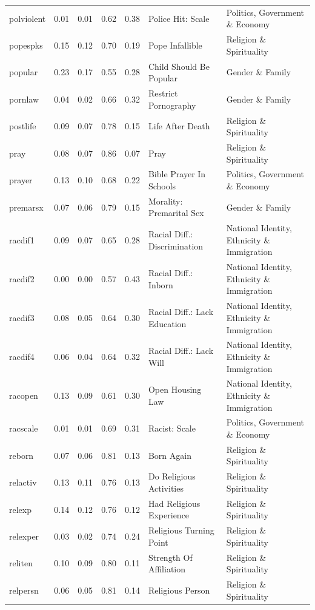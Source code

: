 \documentclass[
  12pt,
]{article}
\begin{document}
\begin{landscape}
\begin{scriptsize}
\begin{longtable}{|p{1.75in}|p{0.3in}|p{0.3in}|p{0.3in}|p{0.3in}|p{2.5in}|p{2.5in}}
polviolent & 0.01 & 0.01 & 0.62 & 0.38 & Police Hit: Scale & Politics, Government \& Economy \\ 
popespks & 0.15 & 0.12 & 0.70 & 0.19 & Pope Infallible & Religion \& Spirituality \\ 
popular & 0.23 & 0.17 & 0.55 & 0.28 & Child Should Be Popular & Gender \& Family \\ 
pornlaw & 0.04 & 0.02 & 0.66 & 0.32 & Restrict Pornography & Gender \& Family \\ 
postlife & 0.09 & 0.07 & 0.78 & 0.15 & Life After Death & Religion \& Spirituality \\ 
pray & 0.08 & 0.07 & 0.86 & 0.07 & Pray & Religion \& Spirituality \\ 
prayer & 0.13 & 0.10 & 0.68 & 0.22 & Bible Prayer In Schools & Politics, Government \& Economy \\ 
premarsx & 0.07 & 0.06 & 0.79 & 0.15 & Morality: Premarital Sex & Gender \& Family \\ 
racdif1 & 0.09 & 0.07 & 0.65 & 0.28 & Racial Diff.: Discrimination & National Identity, Ethnicity \& Immigration \\ 
racdif2 & 0.00 & 0.00 & 0.57 & 0.43 & Racial Diff.: Inborn & National Identity, Ethnicity \& Immigration \\ 
racdif3 & 0.08 & 0.05 & 0.64 & 0.30 & Racial Diff.: Lack Education & National Identity, Ethnicity \& Immigration \\ 
racdif4 & 0.06 & 0.04 & 0.64 & 0.32 & Racial Diff.: Lack Will & National Identity, Ethnicity \& Immigration \\ 
racopen & 0.13 & 0.09 & 0.61 & 0.30 & Open Housing Law & National Identity, Ethnicity \& Immigration \\ 
racscale & 0.01 & 0.01 & 0.69 & 0.31 & Racist: Scale & Politics, Government \& Economy \\ 
reborn & 0.07 & 0.06 & 0.81 & 0.13 & Born Again & Religion \& Spirituality \\ 
relactiv & 0.13 & 0.11 & 0.76 & 0.13 & Do Religious Activities & Religion \& Spirituality \\ 
relexp & 0.14 & 0.12 & 0.76 & 0.12 & Had Religious Experience & Religion \& Spirituality \\ 
relexper & 0.03 & 0.02 & 0.74 & 0.24 & Religious Turning Point & Religion \& Spirituality \\ 
reliten & 0.10 & 0.09 & 0.80 & 0.11 & Strength Of Affiliation & Religion \& Spirituality \\ 
relpersn & 0.06 & 0.05 & 0.81 & 0.14 & Religious Person & Religion \& Spirituality \\ 

\end{longtable}
\end{scriptsize}
\end{landscape}
\end{document}
